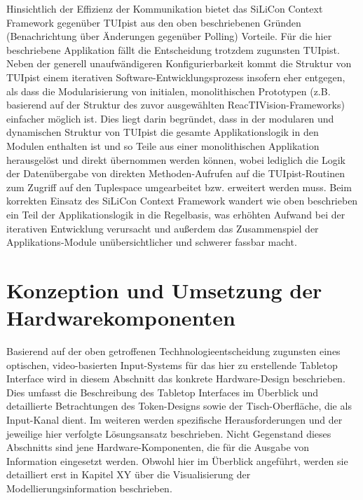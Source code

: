 Hinsichtlich der Effizienz der Kommunikation bietet das SiLiCon Context Framework gegenüber TUIpist aus den oben beschriebenen Gründen (Benachrichtung über Änderungen gegenüber Polling) Vorteile. Für die hier beschriebene Applikation fällt die Entscheidung trotzdem zugunsten TUIpist. Neben der generell unaufwändigeren Konfigurierbarkeit kommt die Struktur von TUIpist einem iterativen Software-Entwicklungsprozess insofern eher entgegen, als dass die Modularisierung von initialen, monolithischen Prototypen (z.B. basierend auf der Struktur des zuvor ausgewählten ReacTIVision-Frameworks) einfacher möglich ist. Dies liegt darin begründet, dass in der modularen und dynamischen Struktur von TUIpist die gesamte Applikationslogik in den Modulen enthalten ist und so Teile aus einer monolithischen Applikation herausgelöst und direkt übernommen werden können, wobei lediglich die Logik der Datenübergabe von direkten Methoden-Aufrufen auf die TUIpist-Routinen zum Zugriff auf den Tuplespace umgearbeitet bzw. erweitert werden muss. Beim korrekten Einsatz des SiLiCon Context Framework wandert wie oben beschrieben ein Teil der Applikationslogik in die Regelbasis, was erhöhten Aufwand bei der iterativen Entwicklung verursacht und außerdem das Zusammenspiel der Applikations-Module unübersichtlicher und schwerer fassbar macht.



\section{Konzeption und Umsetzung der Hardwarekomponenten} %
\label{sec:konzeption_und_umsetzung_der_hardwarekomponenten}

Basierend auf der oben getroffenen Techhnologieentscheidung zugunsten eines optischen, video-basierten Input-Systems für das hier zu erstellende Tabletop Interface wird in diesem Abschnitt das konkrete Hardware-Design beschrieben. Dies umfasst die Beschreibung des Tabletop Interfaces im Überblick und detaillierte Betrachtungen des Token-Designs sowie der Tisch-Oberfläche, die als Input-Kanal dient. Im weiteren werden spezifische Herausforderungen und der jeweilige hier verfolgte Lösungsansatz beschrieben. Nicht Gegenstand dieses Abschnitts sind jene Hardware-Komponenten, die für die Ausgabe von Information eingesetzt werden. Obwohl hier im Überblick angeführt, werden sie detailliert erst in Kapitel XY über die Visualisierung der Modellierungsinformation beschrieben.

